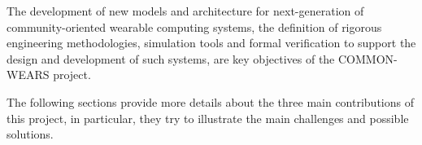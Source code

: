 \documentclass[12pt,a4paper]{article}
\begin{document}
The development of new models and architecture for next-generation of community-oriented wearable computing systems,
the definition of rigorous engineering methodologies,
simulation tools and formal verification to support the design and development of such systems,
are key objectives of the COMMON-WEARS project.

	

The following sections provide more details about the three main contributions of this project,
in particular,
they try to illustrate the main challenges and possible solutions.
\end{document}
